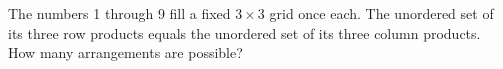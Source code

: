 The numbers 1 through 9 fill a fixed $3\times3$ grid once each. The unordered set of its three row products equals the unordered set of its three column products. How many arrangements are possible?
